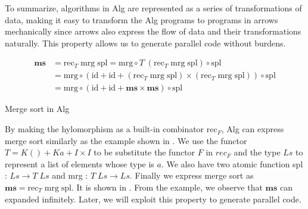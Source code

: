 To summarize, algorithms in Alg are represented as a series of transformations of data, making it easy to transform the Alg programs to programs in arrows mechanically since arrows also express the flow of data and their transformations naturally. This property allows us to generate parallel code without burdens.

\begin{listing}[ht]
\begin{align*}
\mathbf{ms} &= \text{rec}_T \; \text{mrg} \; \text{spl} = \text{mrg} \circ T \; (\text{rec}_T \; \text{mrg} \; \text{spl}) \circ \text{spl} \\
& = \text{mrg} \circ (\text{id} + \text{id} + (\text{rec}_T \; \text{mrg} \; \text{spl}) \times (\text{rec}_T \; \text{mrg} \; \text{spl})) \circ \text{spl} \\
& = \text{mrg}  \circ (\text{id} + \text{id} + \mathbf{ms} \times \mathbf{ms}) \circ \text{spl}
\end{align*}
\caption{Merge sort in Alg} \label{p:pal:c5}
\end{listing}

By making the hylomorphism as a built-in combinator $\text{rec}_F$, Alg can express merge sort similarly as the example shown in . We use the functor $T = K () + K a + I \times I $ to be substitute the functor $F$ in $rec_F$ and the type $Ls$ to represent a list of elements whose type is $a$. We also have two atomic function spl : $Ls \rightarrow T \; Ls$ and mrg : $T \; Ls \rightarrow Ls$. Finally we express merge sort as $\mathbf{ms} = \text{rec}_T \; \text{mrg} \; \text{spl}$. It is shown in . From the example, we observe that $\mathbf{ms}$ can expanded infinitely. Later, we will exploit this property to generate parallel code. 

